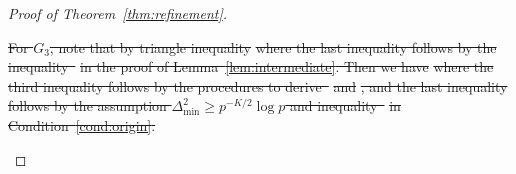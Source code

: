 \documentclass[lettersize,onecolumn,journal]{IEEEtran}
\theoremstyle{definition}
\theoremstyle{definition}
\newcommand{\of}[1]{\left(#1\right)}
\providecommand{\DIFdeltex}[1]{{\protect\color{red}\sout{#1}}}                      %
\providecommand{\DIFdel}[1]{\texorpdfstring{\DIFdeltex{#1}}{}} %
\begin{document}
\begin{proof}[Proof of Theorem~\ref{thm:refinement}]
\begin{enumerate}
\DIFdel{For $G_3$, note that by triangle inequality
    }%
\DIFdel{where the last inequality follows by the inequality~}%
\DIFdel{in the proof of Lemma~\ref{lem:intermediate}.
   Then we have 
    }%
\DIFdel{where the third inequality follows by the procedures to derive~}%
\DIFdel{and }%
    \DIFdel{, and the last inequality follows by the assumption $\Delta_{\min}^2 \geq p^{-K/2} \log p$ and inequality~}%
\DIFdel{in Condition~\ref{cond:origin}.
    }%


\end{enumerate}
\end{proof}
\end{document}
